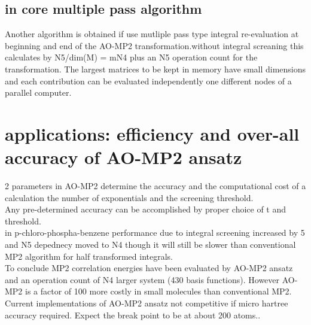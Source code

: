 \documentclass[10pt, draft]{article}
\begin{document}
\subsection{in core multiple pass algorithm}
Another algorithm is obtained if use mutliple pass type integral re-evaluation at beginning and end of the AO-MP2 transformation.without integral screaning this calculates by N5/dim(M) = mN4 plus an N5 operation count for the transformation.  The largest matrices to be kept in memory have small dimensions and each contribution can be evaluated independently one different nodes of a parallel computer.

\section{applications: efficiency and over-all accuracy of AO-MP2 ansatz}
2 parameters in AO-MP2 determine the accuracy and the computational cost of a calculation the number of exponentials and the screening threshold.\\
Any pre-determined accuracy can be accomplished by proper choice of t and threshold.  \\
in p-chloro-phospha-benzene performance due to integral screening increased by 5 and N5 depednecy moved to N4 though it will still be slower than conventional MP2 algorithm for half transformed integrals.  \\
To conclude MP2 correlation energies have been evaluated by AO-MP2 ansatz and an operation count of N4 larger system (430 basis functions).  However AO-MP2 is a factor of 100 more costly in small molecules than conventional MP2.  Current implementations of AO-MP2 ansatz not competitive if micro hartree accuracy required.  Expect the break point to be at about 200 atoms..  
\end{document}
